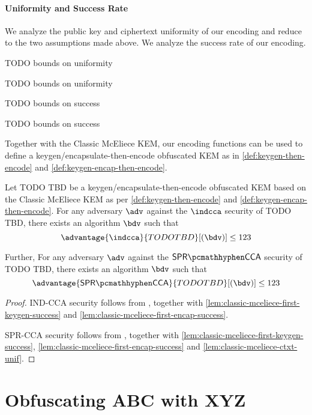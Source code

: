 \paragraph{Uniformity and Success Rate}

We analyze the public key and ciphertext uniformity of our encoding and reduce to the two assumptions made above. We analyze the success rate of our encoding.

\begin{lemma} \label{lem:classic-mceliece-pk-unif}
    TODO bounds on uniformity
\end{lemma}

\begin{lemma} \label{lem:classic-mceliece-ctxt-unif}
    TODO bounds on uniformity
\end{lemma}

\begin{lemma} \label{lem:classic-mceliece-first-keygen-success}
    TODO bounds on success
\end{lemma}

\begin{lemma}[[First-encap success probability of TODO TBD] \label{lem:classic-mceliece-first-encap-success}
    TODO bounds on success
\end{lemma}

Together with the Classic McEliece KEM, our encoding functions can be used to define a keygen/encapsulate-then-encode obfuscated KEM as in \cref{def:keygen-then-encode} and \ref{def:keygen-encap-then-encode}.

\begin{theorem}
    Let TODO TBD be a keygen/encapsulate-then-encode obfuscated KEM based on the Classic McEliece KEM as per \cref{def:keygen-then-encode} and \ref{def:keygen-encap-then-encode}. For any adversary $\adv$ against the $\indcca$ security of TODO TBD, there exists an algorithm $\bdv$ such that
    \[ \advantage{\indcca}{TODO TBD}[(\bdv)] \leq 123 \]

    Further,  For any adversary $\adv$ against the $\sprcca$ security of TODO TBD, there exists an algorithm $\bdv$ such that
    \[ \advantage{\sprcca}{TODO TBD}[(\bdv)] \leq 123 \]
\end{theorem}
\begin{proof}
    IND-CCA security follows from \cite[Theorem~2.12]{CCS:GunSteVei24}, together with \cref{lem:classic-mceliece-first-keygen-success} and \ref{lem:classic-mceliece-first-encap-success}.
    
    SPR-CCA security follows from \cite[Theorem~2.13]{CCS:GunSteVei24}, together with \cref{lem:classic-mceliece-first-keygen-success}, \ref{lem:classic-mceliece-first-encap-success} and \ref{lem:classic-mceliece-ctxt-unif}.
\end{proof}

\section{Obfuscating ABC with XYZ} \label{sec:tbd}

